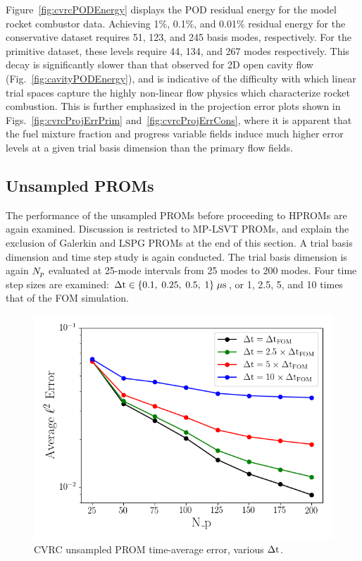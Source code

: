 Figure~\ref{fig:cvrcPODEnergy} displays the POD residual energy for the model rocket combustor data. Achieving 1\%, 0.1\%, and 0.01\% residual energy for the conservative dataset requires 51, 123, and 245 basis modes, respectively. For the primitive dataset, these levels require 44, 134, and 267 modes respectively. This decay is significantly slower than that observed for 2D open cavity flow (Fig.~\ref{fig:cavityPODEnergy}), and is indicative of the difficulty with which linear trial spaces capture the highly non-linear flow physics which characterize rocket combustion. This is further emphasized in the projection error plots shown in Figs.~\ref{fig:cvrcProjErrPrim} and~\ref{fig:cvrcProjErrCons}, where it is apparent that the fuel mixture fraction and progress variable fields induce much higher error levels at a given trial basis dimension than the primary flow fields.

\subsection{Unsampled PROMs}

The performance of the unsampled PROMs before proceeding to HPROMs are again examined. Discussion is restricted to MP-LSVT PROMs, and explain the exclusion of Galerkin and LSPG PROMs at the end of this section. A trial basis dimension and time step study is again conducted. The trial basis dimension is again $N_p$ evaluated at 25-mode intervals from 25 modes to 200 modes. Four time step sizes are examined: $\Delta \text{t} \in \{ 0.1, \; 0.25, \; 0.5, \; 1 \} \; \mu \text{s}$, or 1, 2.5, 5, and 10 times that of the FOM simulation.

\begin{figure}
	\centering
	\includegraphics[width=0.7\linewidth]{Chapters/CavityAndCVRC/Images/cvrc/unsampled/unsampled_avg_mode_Average_errorRaw.png}
	\caption{\label{fig:cvrcUnsampledROMErrVsModes}CVRC unsampled PROM time-average error, various $\Delta \text{t}$.}
\end{figure}

